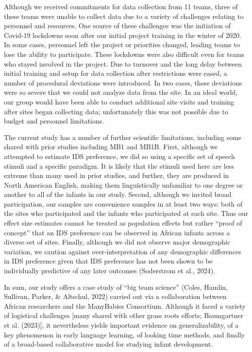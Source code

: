 \documentclass[
  ,man,floatsintext]{apa6}
\begin{document}
Although we received commitments for data collection from 11 teams, three of these teams were unable to collect data due to a variety of challenges relating to personnel and resources. One source of these challenges was the initiation of Covid-19 lockdowns soon after our initial project training in the winter of 2020. In some cases, personnel left the project or priorities changed, leading teams to lose the ability to participate. These lockdowns were also difficult even for teams who stayed involved in the project. Due to turnover and the long delay between initial training and setup for data collection after restrictions were eased, a number of procedural deviations were introduced. In two cases, these deviations were so severe that we could not analyze data from the site. In an ideal world, our group would have been able to conduct additional site visits and training after sites began collecting data; unfortunately this was not possible due to budget and personnel limitations.

The current study has a number of further scientific limitations, including some shared with prior studies including MB1 and MB1B. First, although we attempted to estimate IDS preference, we did so using a specific set of speech stimuli and a specific paradigm. It is likely that the stimuli used here are less extreme than many used in prior studies, and further, they are produced in North American English, making them linguistically unfamiliar to one degree or another to all of the infants in our study. Second, although we invited broad participation, our samples are convenience samples in at least two ways: both of the sites who participated and the infants who participated at each site. Thus our effect size estimates cannot be treated as population effects but rather ``proof of concept'' that an IDS preference can be observed in African infants across a diverse set of sites. Finally, although we did not observe major demographic variation, we caution against over-interpretation of any demographic differences in IDS preference given that IDS preference has not been shown to be individually predictive of any later outcomes (Soderstrom et al., 2024).

In sum, our study offers a case study of ``big team science'' (Coles, Hamlin, Sullivan, Parker, \& Altschul, 2022) carried out via a collaboration between African researchers and the ManyBabies Consortium. Although it faced a variety of logistical challenges {[}many shared with other grass roots efforts; Baumgartner et al. (2023){]}, it nevertheless yields important evidence on generalizability, of a key phenomenon in early language learning, of looking time methods, and finally of a broad-based collaborative model for studying infant development.
\end{document}
